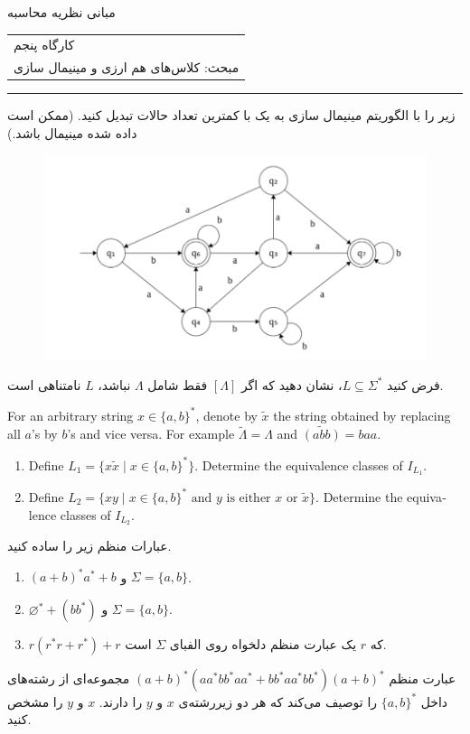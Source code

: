 \documentclass{article}
\newcommand*\circled[1]{
	\tikz[baseline=(char.base)]{
		\node[shape=circle,draw,inner sep=-1pt,color=red] (char) {\textcolor{black}{#1}\strut}
	}\kern-3pt
}
\renewcommand{\labelenumii}{\alph{enumii})}
\let\oldlabelenumii=\labelenumii
\newcommand{\StartCircledEnumii}{\renewcommand{\labelenumii}{\circled{\oldlabelenumii}}}
\newcommand{\EndCircledEnumii}{\renewcommand{\labelenumii}{\oldlabelenumii}}
\newcommand{\CircledEnumii}{\StartCircledEnumii\item\EndCircledEnumii}
\begin{document}
	\begin{center}
		\Huge
		مبانی نظریه محاسبه
	\end{center}
	\Large
	\begin{tabularx}{\linewidth}{>{\raggedleft\arraybackslash}X}
		کارگاه پنجم
		\\
		مبحث: کلاس‌های هم ارزی و مینیمال سازی
		\\
		
	\end{tabularx}
	\rule{\textwidth}{1pt}
	\large
	\begin{enumerate}
		\item 
		زیر را با الگوریتم مینیمال سازی به یک 
		با کمترین تعداد حالات
		 تبدیل کنید. (ممکن است  داده شده مینیمال باشد.)
		 	\begin{figure}[h]
		 	\centering
		 	\includegraphics[width=0.7\linewidth]{image}
		 \end{figure}
		 \item 
		 فرض کنید $L \subseteq \Sigma^*$، نشان دهید که اگر 
		 $[\Lambda]$
		 فقط شامل 
		 $\Lambda$
		 نباشد، $L$ نامتناهی است.
		 \begin{latin}
		 	\item 
		 	For an arbitrary string $x \in \{a,b\}^*$, denote by $\tilde{x}$ the string obtained by replacing all $a$'s by $b$'s and vice versa. For example $\tilde{\Lambda} = \Lambda$ and $\widetilde{(abb)} = baa$.
		 	\begin{enumerate}
		 		\item Define $L_1 = \{x\tilde{x} \; | \; x \in \{a,b\}^*\}$. Determine the equivalence classes of $I_{L_1}$.
		 		\CircledEnumii Define $L_2 = \{xy \; | \; \text{$x \in \{a,b\}^*$ and $y$ is either $x$ or $\tilde{x}$}\}$. Determine the equivalence classes of $I_{L_2}$.
		 	\end{enumerate}
		 \end{latin}
		\item 
		عبارات منظم زیر را ساده کنید.
		\begin{enumerate}
			\item $(a+b)^*a^* + b$ و $\Sigma = \{a,b\}$.
			\item $\varnothing^* + (bb^*)$ و $\Sigma = \{a,b\}$.
			\item $r(r^*r+r^*)+r$ 
			که $r$ یک عبارت منظم دلخواه روی الفبای $\Sigma$ است.
		\end{enumerate}
	\item
	عبارت منظم 
	$(a+b)^*(aa^*bb^*aa^* + bb^*aa^*bb^*)(a+b)^*$
	مجموعه‌ای از رشته‌های داخل 
	$\{a,b\}^*$
	را توصیف می‌کند که هر دو زیررشته‌ی $x$ و $y$ را دارند. $x$ و $y$ را مشخص کنید.

	
\end{enumerate}
\end{document}
